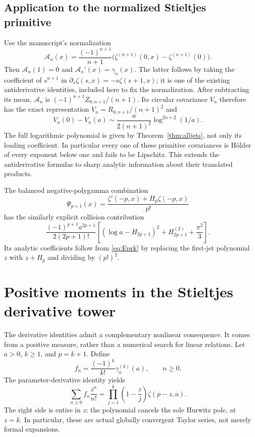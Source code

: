 \documentclass[11pt]{article}
\numberwithin{equation}{section}
\theoremstyle{definition}\newtheorem{definition}[theorem]{Definition}
\theoremstyle{remark}\newtheorem{remark}[theorem]{Remark}
\begin{document}
\subsection{Application to the normalized Stieltjes primitive}

Use the manuscript's normalization
\begin{equation}\label{eq:Stieltjesprimitive}
 \mathcal A_n(x)=\frac{(-1)^{n+1}}{n+1}
       \bigl(\zeta^{(n+1)}(0,x)-\zeta^{(n+1)}(0)\bigr).
\end{equation}
Then $\mathcal A_n(1)=0$ and $\mathcal A_n'(x)=\gamma_n(x)$.
The latter follows by taking the coefficient of $s^{n+1}$ in
$\partial_x\zeta(s,x)=-s\zeta(s+1,x)$; it is one of the existing
antiderivative identities, included here to fix the normalization.
After subtracting its mean, $\mathcal A_n$ is
$(-1)^{n+1}Z_{0,n+1}/(n+1)$. Its circular covariance $V_n$ therefore
has the exact representation $V_n=R_{0,n+1}/(n+1)^2$ and
\begin{equation}\label{eq:primitivecusp}
 V_n(0)-V_n(a)\sim\frac{a}{2(n+1)^2}\log^{2n+2}(1/a).
\end{equation}
The full logarithmic polynomial is given by Theorem~\ref{thm:alljets},
not only its leading coefficient. In particular every one of these
primitive covariances is H\"older of every exponent below one and fails
to be Lipschitz. This extends the antiderivative formulas to sharp
analytic information about their translated products.

The balanced negative-polygamma combination
\[
 \Psi_{p+1}(x)=\frac{\zeta'(-p,x)+H_p\zeta(-p,x)}{p!}
\]
has the similarly explicit collision contribution
\begin{equation}\label{eq:balancedcusp}
 \frac{(-1)^{p+1}a^{2p+1}}{2(2p+1)!}
       \left[(\log a-H_{2p+1})^2
                         +H_{2p+1}^{(2)}+\frac{\pi^2}{3}\right].
\end{equation}
Its analytic coefficients follow from \eqref{eq:Eprk} by replacing the
first-jet polynomial $z$ with $z+H_p$ and dividing by $(p!)^2$.

\section{Positive moments in the Stieltjes derivative tower}
\label{sec:hankel}

The derivative identities admit a complementary nonlinear consequence.
It comes from a positive measure, rather than a numerical search for
linear relations. Let $a>0$, $k\ge1$, and $p=k+1$. Define
\begin{equation}\label{eq:fn}
 f_n=\frac{(-1)^k}{k!}\gamma_n^{(k)}(a),\qquad n\ge0.
\end{equation}
The parameter-derivative identity yields
\begin{equation}\label{eq:fgenerator}
 \sum_{n\ge0}f_n\frac{z^n}{n!}
     =\prod_{j=1}^k\left(1-\frac zj\right)\zeta(p-z,a).
\end{equation}
The right side is entire in $z$: the polynomial cancels the sole
Hurwitz pole, at $z=k$. In particular, these are actual globally
convergent Taylor series, not merely formal expansions.
\end{document}
